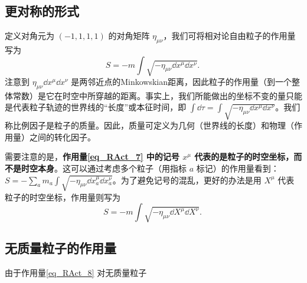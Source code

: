 \subsection{更对称的形式}
定义对角元为 $(-1,1,1,1)$ 的对角矩阵 $\eta_{\mu\nu}$，我们可将相对论自由粒子的作用量写为
\begin{equation}\label{eq_RAct_7}
S=-m\int \sqrt{-\eta_{\mu\nu}\dd x^\mu\dd x^\nu}.~
\end{equation}
注意到 $\eta_{\mu\nu}\dd x^\mu\dd x^\nu$ 是两邻近点的Minkowskian距离，因此粒子的作用量（到一个整体常数）是它在时空中所穿越的距离。事实上，我们所能做出的坐标不变的量只能是代表粒子轨迹的世界线的“长度”或本征时间，即 $\int\dd \tau=\int \sqrt{-\eta_{\mu\nu}\dd x^\mu\dd x^\nu}$。我们称比例因子是粒子的质量。因此，质量可定义为几何（世界线的长度）和物理（作用量）之间的转化因子。

需要注意的是，\textbf{作用量\autoref{eq_RAct_7} 中的记号 $x^\mu$ 代表的是粒子的时空坐标，而不是时空本身}。这可以通过考虑多个粒子（用指标 $a$ 标记）的作用量看到： $S=-\sum_a m_a\int \sqrt{-\eta_{\mu\nu}\dd x_a^\mu\dd x_a^\nu}$。为了避免记号的混乱，更好的办法是用 $X^\mu$ 代表粒子的时空坐标，作用量则写为
\begin{equation}\label{eq_RAct_8}
S=-m\int \sqrt{-\eta_{\mu\nu}\dd X^\mu\dd X^\nu}.~
\end{equation}


\subsection{无质量粒子的作用量}
由于作用量\autoref{eq_RAct_8} 对无质量粒子

